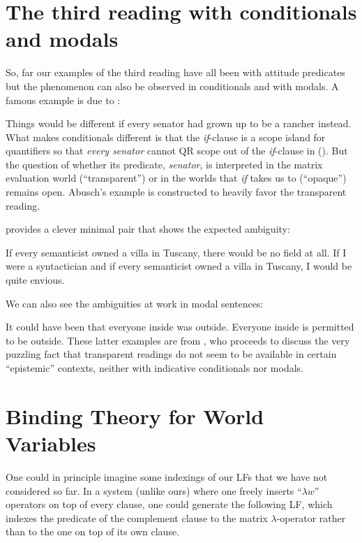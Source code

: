 \section{The third reading with conditionals and modals}
\label{sec:third-conditional-modal}

So, far our examples of the third reading have all been with attitude predicates
but the phenomenon can also be observed in conditionals and with modals. A
famous example is due to \cite{abusch:1994:indefinites}:

\ex
Things would be different if every senator had grown up to be a rancher instead. 
\xe
%
What makes conditionals different is that the \emph{if}-clause is a scope island
for quantifiers so that \emph{every senator} cannot QR scope out of the
\emph{if}-clause in (\lastx). But the question of whether its predicate,
\emph{senator}, is interpreted in the matrix evaluation world (``transparent'')
or in the worlds that \emph{if} takes us to (``opaque'') remains open. Abusch's
example is constructed to heavily favor the transparent reading.

\cite{percus-2000-constraints} provides a clever minimal pair that shows the
expected ambiguity:

\pex
\a If every semanticist owned a villa in Tuscany, there would be no field
at all.
\a If I were a syntactician and if every semanticist owned a villa in Tuscany, I
would be quite envious.
\xe

We can also see the ambiguities at work in modal sentences:

\pex
\a It could have been that everyone inside was outside.
\a Everyone inside is permitted to be outside.
\xe
%
These latter examples are from \cite{yalcin-2015-epistemic-de-re}, who proceeds
to discuss the very puzzling fact that transparent readings do not seem to be
available in certain ``epistemic'' contexts, neither with indicative
conditionals nor modals.

\section{Binding Theory for World Variables}

One could in principle imagine some indexings of our LFs that we have not
considered so far. In a system (unlike ours) where one freely inserts ``$\lambda
w$'' operators on top of every clause, one could generate the following LF,
which indexes the predicate of the complement clause to the matrix
$\lambda$-operator rather than to the one on top of its own clause.

